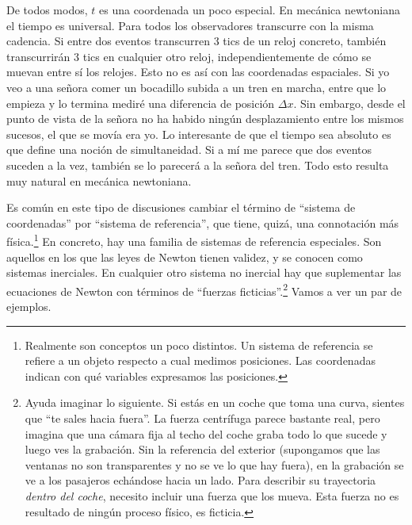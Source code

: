 De todos modos, \(t\) es una coordenada un poco especial. En mecánica newtoniana el tiempo es universal. Para todos los observadores transcurre con la misma cadencia. Si entre dos eventos transcurren 3 tics de un reloj concreto, también transcurrirán 3 tics en cualquier otro reloj, independientemente de cómo se muevan entre sí los relojes. Esto no es así con las coordenadas espaciales. Si yo veo a una señora comer un bocadillo subida a un tren en marcha, entre que lo empieza y lo termina mediré una diferencia de posición \(\Delta x\). Sin embargo, desde el punto de vista de la señora no ha habido ningún desplazamiento entre los mismos sucesos, el que se movía era yo. Lo interesante de que el tiempo sea absoluto es que define una noción de simultaneidad. Si a mí me parece que dos eventos suceden a la vez, también se lo parecerá a la señora del tren. Todo esto resulta muy natural en mecánica newtoniana.

Es común en este tipo de discusiones cambiar el término de ``sistema de coordenadas'' por ``sistema de referencia'', que tiene, quizá, una connotación más física.\footnote{Realmente son conceptos un poco distintos. Un sistema de referencia se refiere a un objeto respecto a cual medimos posiciones. Las coordenadas indican con qué variables expresamos las posiciones.} En concreto, hay una familia de sistemas de referencia especiales. Son aquellos en los que las leyes de Newton tienen validez, y se conocen como sistemas inerciales. En cualquier otro sistema no inercial hay que suplementar las ecuaciones de Newton con términos de ``fuerzas ficticias''.\footnote{Ayuda imaginar lo siguiente. Si estás en un coche que toma una curva, sientes que ``te sales hacia fuera''. La fuerza centrífuga parece bastante real, pero imagina que una cámara fija al techo del coche graba todo lo que sucede y luego ves la grabación. Sin la referencia del exterior (supongamos que las ventanas no son transparentes y no se ve lo que hay fuera), en la grabación se ve a los pasajeros echándose hacia un lado. Para describir su trayectoria \emph{dentro del coche}, necesito incluir una fuerza que los mueva. Esta fuerza no es resultado de ningún proceso físico, es ficticia.} Vamos a ver un par de ejemplos.

